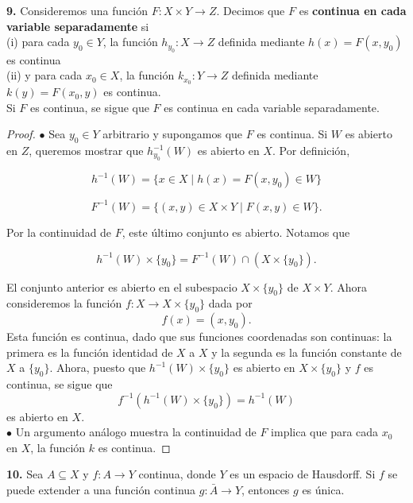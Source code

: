 \documentclass{article}
\begin{document}
\newpage

\begin{mybox}
	\textbf{9. } Consideremos una función $F: X \times Y \rightarrow Z$. Decimos que $F$ es \textbf{continua en cada variable separadamente} si \\
	
	(i) para cada $y_{0} \in Y$, la función $h_{y_{0}}: X \rightarrow Z$ definida mediante $h(x) = F(x, y_{0})$ es continua \\
	
	(ii) y para cada $x_{0} \in X$, la función $k_{x_{0}}: Y \rightarrow Z$ definida mediante $k(y) = F(x_{0}, y)$ es continua. \\
	
	Si $F$ es continua, se sigue que $F$ es continua en cada variable separadamente. 
\end{mybox}	
\begin{proof}
	$\bullet$ Sea $y_{0} \in Y$ arbitrario y supongamos que $F$ es continua. Si $W$ es abierto en $Z$, queremos mostrar que $h_{y_{0}}^{-1}(W)$ es abierto en $X$. Por definición,
	
	$$ h^{-1}(W) = \{ x \in X \mid h(x) =  F(x, y_{0}) \in W \} $$
	
	$$ F^{-1}(W) = \{ (x, y) \in X \times Y \mid F(x, y) \in W \} .$$
	
	Por la continuidad de $F$, este último conjunto es abierto. Notamos que 
	
	$$ h^{-1}(W) \times \{ y_{0} \} = F^{-1}(W) \cap (X \times \{ y_{0} \}) .$$
	
	El conjunto anterior es abierto en el subespacio $X \times \{ y_{0} \}$ de $X \times Y$. Ahora consideremos la función $f:X \rightarrow X \times \{ y_{0} \}$ dada por 
	$$ f(x) = (x, y_{0}). $$
	Esta función es continua, dado que sus funciones coordenadas son continuas: la primera es la función identidad de $X$ a $X$ y la segunda es la función constante de $X$ a $\{ y_{0} \}$. Ahora, puesto que $h^{-1}(W) \times \{ y_{0} \}$ es abierto en $X \times \{ y_{0} \}$ y $f$ es continua, se sigue que 
	$$ f^{-1}( h^{-1}(W) \times \{ y_{0} \} ) = h^{-1}(W)$$
	es abierto en $X$.  \\
	
$\bullet$ Un argumento análogo muestra la continuidad de $F$ implica que para cada $x_{0}$ en $X$, la función $k$ es continua. 
\end{proof}

\newpage

\begin{mybox}
	\textbf{10. } Sea $A \subseteq X$ y $f: A \rightarrow Y$ continua, donde $Y$ es un espacio de Hausdorff. Si $f$ se puede extender a una función continua $g: \bar{A} \rightarrow Y$, entonces $g$ es única. 
\end{mybox}	
\end{document}
